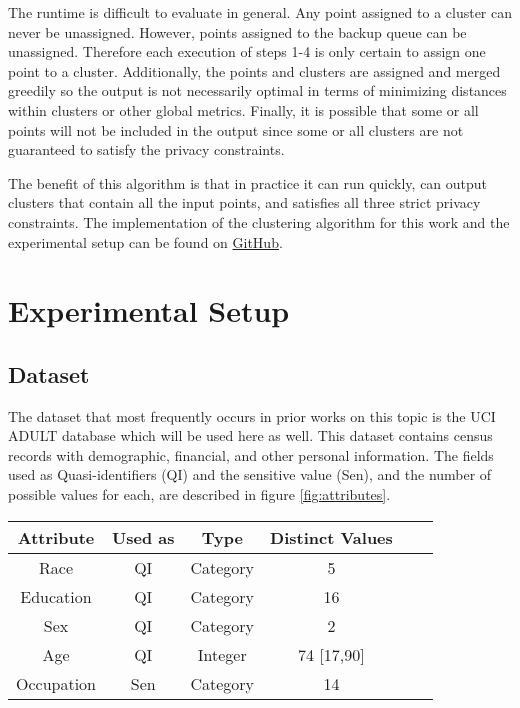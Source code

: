 The runtime is difficult to evaluate in general. Any point assigned to a cluster can never be unassigned. However, points assigned to the backup queue can be unassigned. Therefore each execution of steps 1-4 is only certain to assign one point to a cluster. Additionally, the points and clusters are assigned and merged greedily so the output is not necessarily optimal in terms of minimizing distances within clusters or other global metrics. Finally, it is possible that some or all points will not be included in the output since some or all clusters are not guaranteed to satisfy the privacy constraints.

The benefit of this algorithm is that in practice it can run quickly, can output clusters that contain all the input points, and satisfies all three strict privacy constraints. The implementation of the clustering algorithm for this work and the experimental setup can be found on \hyperlink{https://github.com/SamBoger/Query-Accuracy-on-l-Diversity}{GitHub}.

\section{Experimental Setup}

\subsection{Dataset}
The dataset that most frequently occurs in prior works on this topic is the UCI ADULT database\cite{adultDatabase} which will be used here as well. This dataset contains census records with demographic, financial, and other personal information. The fields used as Quasi-identifiers (QI) and the sensitive value (Sen), and the number of possible values for each, are described in figure \ref{fig:attributes}.

\begin{figure*}
\centering
\begin{tabular}{|c||c|c|c|c|c|}
\hline
Attribute & Used as & Type & Distinct Values  \\
\hline
\hline
Race & QI & Category & 5 \\
\hline
Education & QI & Category & 16  \\
\hline
Sex & QI & Category & 2  \\
\hline
Age & QI & Integer & 74 [17,90]  \\
\hline
Occupation & Sen & Category & 14  \\
\hline
\end{tabular}
\caption{Attributes}
\label{fig:attributes}
\end{figure*}

